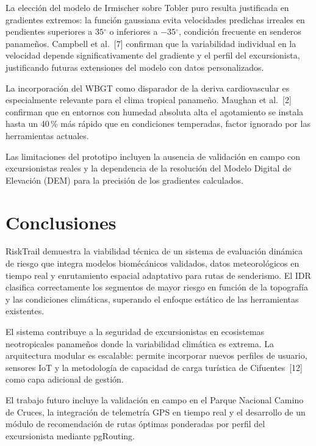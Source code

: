 \documentclass[10pt,letterpaper,twocolumn]{article}
\begin{document}
La elecci\'{o}n del modelo de Irmischer sobre Tobler puro resulta
justificada en gradientes extremos: la funci\'{o}n gaussiana evita
velocidades predichas irreales en pendientes superiores a
$35{^\circ}$ o inferiores a $-35{^\circ}$, condici\'{o}n frecuente en
senderos paname\~{n}os. Campbell et al.~[7] confirman que la variabilidad
individual en la velocidad depende significativamente del gradiente y el
perfil del excursionista, justificando futuras extensiones del modelo con
datos personalizados.

La incorporaci\'{o}n del WBGT como disparador de la deriva cardiovascular
es especialmente relevante para el clima tropical paname\~{n}o. Maughan
et al.~[2] confirman que en entornos con humedad absoluta alta el
agotamiento se instala hasta un 40\,\% m\'{a}s r\'{a}pido que en
condiciones temperadas, factor ignorado por las herramientas actuales.

Las limitaciones del prototipo incluyen la ausencia de validaci\'{o}n en
campo con excursionistas reales y la dependencia de la resoluci\'{o}n del
Modelo Digital de Elevaci\'{o}n (DEM) para la precisi\'{o}n de los
gradientes calculados.

\section{Conclusiones}

RiskTrail demuestra la viabilidad t\'{e}cnica de un sistema de
evaluaci\'{o}n din\'{a}mica de riesgo que integra modelos
biom\'{e}c\'{a}nicos validados, datos meteorol\'{o}gicos en tiempo real y
enrutamiento espacial adaptativo para rutas de senderismo. El IDR
clasifica correctamente los segmentos de mayor riesgo en funci\'{o}n de
la topograf\'{i}a y las condiciones clim\'{a}ticas, superando el enfoque
est\'{a}tico de las herramientas existentes.

El sistema contribuye a la seguridad de excursionistas en ecosistemas
neotropicales paname\~{n}os donde la variabilidad clim\'{a}tica es extrema.
La arquitectura modular es escalable: permite incorporar nuevos perfiles de
usuario, sensores IoT y la metodolog\'{i}a de capacidad de carga
tur\'{i}stica de Cifuentes~[12] como capa adicional de gesti\'{o}n.

El trabajo futuro incluye la validaci\'{o}n en campo en el Parque Nacional
Camino de Cruces, la integraci\'{o}n de telemetr\'{i}a GPS en tiempo real
y el desarrollo de un m\'{o}dulo de recomendaci\'{o}n de rutas
\'{o}ptimas ponderadas por perfil del excursionista mediante pgRouting.
\end{document}
